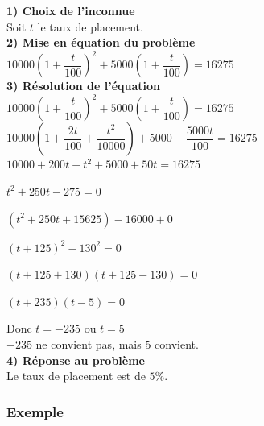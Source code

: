 \textbf{1) Choix de l'inconnue} \\

Soit $ t $ le taux de placement. \\

\textbf{2) Mise en équation du problème} \\

$ 10 000 \left(1 + \dfrac{t}{100}\right)^2 + 5 000 \left(1 + \dfrac{t}{100}\right) = 16 275 $ \\

\textbf{3) Résolution de l'équation} \\

$ 10 000 \left(1 + \dfrac{t}{100}\right)^2 + 5 000 \left(1 + \dfrac{t}{100}\right) = 16 275 $ \\

$ 10 000 \left(1+\dfrac{2t}{100} + \dfrac{t^2}{10 000}\right) + 5 000 + \dfrac{5 000t}{100} = 16275 $ \\

$ 10 000 + 200t + t^2 + 5 000 + 50t = 16275 $ 

$ t^2 + 250t - 275 = 0 $

$ \left(t^2 +250t + 15625\right)-16 000 + 0 $

$ \left(t+125\right)^2-130^2=0 $ 

$ \left(t + 125 + 130\right) \left(t + 125 - 130\right) = 0 $

$ \left(t+235\right)\left(t-5\right) = 0 $

Donc $t= -235$ ou $t=5$ \\

$-235$ ne convient pas, mais $5$ convient. \\

\textbf{4) Réponse au problème} \\


Le taux de placement est de $ 5\% $.

\newpage

\subsubsection{Exemple }



